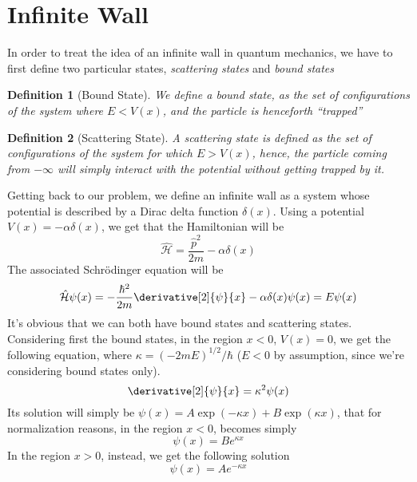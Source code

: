 \documentclass[a4paper, 11pt]{book}
\newcommand{\1}{\opr{\mathds{1}}}
\newcommand{\ham}{\mathcal{H}}
\newcommand{\opr}[1]{\hat{#1}}
\theoremstyle{plain}
\newtheorem{defn}{Definition}
\begin{document}
	\section{Infinite Wall}
	In order to treat the idea of an infinite wall in quantum mechanics, we have to first define two particular states, \textit{scattering states} and \textit{bound states}\\
	\begin{defn}[Bound State]
		We define a bound state, as the set of configurations of the system where $E<V(x)$, and the particle is henceforth ``trapped''
	\end{defn}
	\begin{defn}[Scattering State]
		A scattering state is defined as the set of configurations of the system for which $E>V(x)$, hence, the particle coming from $-\infty$ will simply interact with the potential without getting trapped by it.
	\end{defn}
	Getting back to our problem, we define an infinite wall as a system whose potential is described by a Dirac delta function $\delta(x)$. Using a potential $V(x)=-\alpha\delta(x)$, we get that the Hamiltonian will be
	\begin{equation}
		\opr{\ham}=\frac{\opr{p}^2}{2m}-\alpha\delta(x)
		\label{eq:diracdelta}
	\end{equation}
	The associated Schrödinger equation will be
	\begin{equation}
		\opr{\ham}\psi(x)=-\frac{\hbar^2}{2m}\derivative[2]{\psi}{x}-\alpha\delta(x)\psi(x)=E\psi(x)
		\label{eq:diracdeltapot}
	\end{equation}
	It's obvious that we can both have bound states and scattering states. Considering first the bound states, in the region $x<0$, $V(x)=0$, we get the following equation, where $\kappa=(-2mE)^{1/2}/\hbar$ ($E<0$ by assumption, since we're considering bound states only).
	\begin{equation*}
		\derivative[2]{\psi}{x}=\kappa^2\psi(x)
	\end{equation*}
	Its solution will simply be $\psi(x)=A\exp(-\kappa x)+B\exp(\kappa x)$, that for normalization reasons, in the region $x<0$, becomes simply
	\begin{equation}
		\psi(x)=Be^{\kappa x}
		\label{eq:solutionbounddeltaxneg}
	\end{equation}
	In the region $x>0$, instead, we get the following solution
	\begin{equation}
		\psi(x)=Ae^{-\kappa x}
		\label{eq:solutionboundxpos}
	\end{equation}
\end{document}
